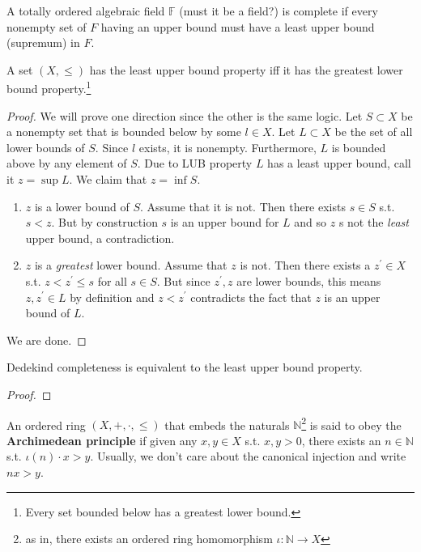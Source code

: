     \begin{definition}
      A totally ordered algebraic field $\mathbb{F}$ (must it be a field?) is complete if every nonempty set of $F$ having an upper bound must have a least upper bound (supremum) in $F$. 
    \end{definition} 

    \begin{theorem}
      A set $(X, \leq)$ has the least upper bound property iff it has the greatest lower bound property.\footnote{Every set bounded below has a greatest lower bound.} 
    \end{theorem}
    \begin{proof}
      We will prove one direction since the other is the same logic. Let $S \subset X$ be a nonempty set that is bounded below by some $l \in X$. Let $L \subset X$ be the set of all lower bounds of $S$. Since $l$ exists, it is nonempty. Furthermore, $L$ is bounded above by any element of $S$. Due to LUB property $L$ has a least upper bound, call it $z = \sup{L}$. We claim that $z = \inf{S}$. 
      \begin{enumerate}
        \item $z$ is a lower bound of $S$. Assume that it is not. Then there exists $s \in S$ s.t. $s < z$. But by construction $s$ is an upper bound for $L$ and so $z$ s not the \textit{least} upper bound, a contradiction. 
        \item $z$ is a \textit{greatest} lower bound. Assume that $z$ is not. Then there exists a $z^\prime \in X$ s.t. $z < z^\prime \leq s$ for all $s \in S$. But since $z^\prime, z$ are lower bounds, this means $z, z^\prime \in L$ by definition and $z < z^\prime$ contradicts the fact that $z$ is an upper bound of $L$. 
      \end{enumerate}
      We are done. 
    \end{proof}

    \begin{theorem}
      Dedekind completeness is equivalent to the least upper bound property. 
    \end{theorem}
    \begin{proof}
      
    \end{proof}

    \begin{definition}
      An ordered ring $(X, +, \cdot, \leq)$ that embeds the naturals $\mathbb{N}$\footnote{as in, there exists an ordered ring homomorphism $\iota: \mathbb{N} \rightarrow X$} is said to obey the \textbf{Archimedean principle} if given any $x, y \in X$ s.t. $x, y > 0$, there exists an $n \in \mathbb{N}$ s.t. $\iota(n) \cdot x > y$. Usually, we don't care about the canonical injection and write $nx > y$. 
    \end{definition}

